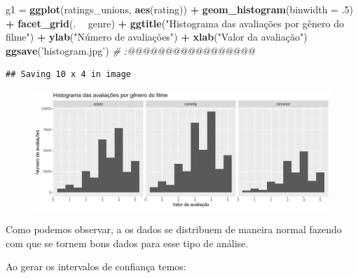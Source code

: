 \documentclass[]{article}
\newenvironment{Shaded}{\begin{snugshade}}{\end{snugshade}}
\newcommand{\KeywordTok}[1]{\textcolor[rgb]{0.13,0.29,0.53}{\textbf{#1}}}
\newcommand{\DataTypeTok}[1]{\textcolor[rgb]{0.13,0.29,0.53}{#1}}
\newcommand{\DecValTok}[1]{\textcolor[rgb]{0.00,0.00,0.81}{#1}}
\newcommand{\StringTok}[1]{\textcolor[rgb]{0.31,0.60,0.02}{#1}}
\newcommand{\CommentTok}[1]{\textcolor[rgb]{0.56,0.35,0.01}{\textit{#1}}}
\newcommand{\OperatorTok}[1]{\textcolor[rgb]{0.81,0.36,0.00}{\textbf{#1}}}
\newcommand{\NormalTok}[1]{#1}
\begin{document}
\begin{Shaded}
\begin{Highlighting}[]
\NormalTok{  g1 =}\StringTok{ }\KeywordTok{ggplot}\NormalTok{(ratings_unions, }\KeywordTok{aes}\NormalTok{(rating)) }\OperatorTok{+}
\StringTok{    }\KeywordTok{geom_histogram}\NormalTok{(}\DataTypeTok{binwidth =}\NormalTok{ .}\DecValTok{5}\NormalTok{) }\OperatorTok{+}\StringTok{ }
\StringTok{    }\KeywordTok{facet_grid}\NormalTok{(. }\OperatorTok{~}\StringTok{ }\NormalTok{genre) }\OperatorTok{+}\StringTok{ }
\StringTok{    }\KeywordTok{ggtitle}\NormalTok{(}\StringTok{"Histograma das avaliações por gênero do filme"}\NormalTok{) }\OperatorTok{+}\StringTok{ }
\StringTok{    }\KeywordTok{ylab}\NormalTok{(}\StringTok{"Número de avaliações"}\NormalTok{) }\OperatorTok{+}\StringTok{ }
\StringTok{    }\KeywordTok{xlab}\NormalTok{(}\StringTok{"Valor da avaliação"}\NormalTok{)}
  \KeywordTok{ggsave}\NormalTok{(}\StringTok{'histogram.jpg'}\NormalTok{) }\CommentTok{# :@@@@@@@@@@@@@@@@@}
\end{Highlighting}
\end{Shaded}

\begin{verbatim}
## Saving 10 x 4 in image
\end{verbatim}

\begin{figure}
\centering
\includegraphics{./histogram.jpg}
\caption{}
\end{figure}

Como podemos observar, a os dados se distribuem de maneira normal
fazendo com que se tornem bons dados para esse tipo de análise.

Ao gerar os intervalos de confiança temos:
\end{document}
